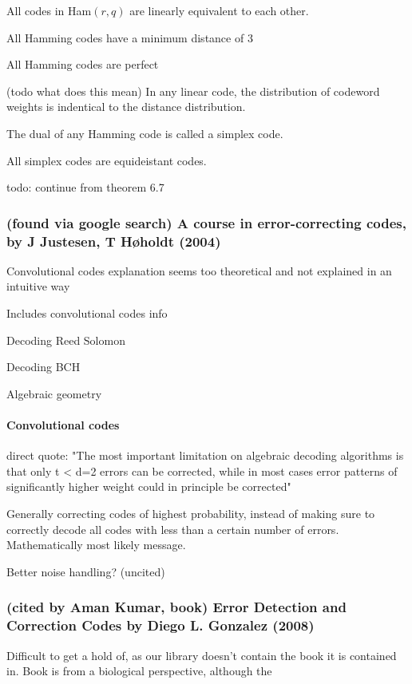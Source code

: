\documentclass{article}
\begin{document}
All codes in Ham$(r,q)$ are linearly equivalent to each other.

All Hamming codes have a minimum distance of 3

All Hamming codes are perfect

(todo what does this mean) In any linear code, the distribution of codeword weights is indentical to the distance distribution.

The dual of any Hamming code is called a simplex code. 	

All simplex codes are equideistant codes.

todo: continue from theorem 6.7

\subsubsection{(found via google search) A course in error-correcting codes, by J Justesen, T Høholdt (2004)}

Convolutional codes explanation seems too theoretical and not explained in an intuitive way

Includes convolutional codes info

Decoding Reed Solomon

Decoding BCH

Algebraic geometry

\paragraph{Convolutional codes}

direct quote: "The most important limitation on algebraic decoding algorithms is that only t < d=2 errors can be corrected, while in most cases error patterns of significantly higher weight could in principle be corrected"

Generally correcting codes of highest probability, instead of making sure to correctly decode all codes with less than a certain number of errors. Mathematically most likely message.

Better noise handling? (uncited)

\subsubsection{(cited by Aman Kumar, book) Error Detection and Correction Codes by Diego L. Gonzalez (2008)}

Difficult to get a hold of, as our library doesn't contain the book it is contained in. Book is from a biological perspective, although the 
\end{document}
